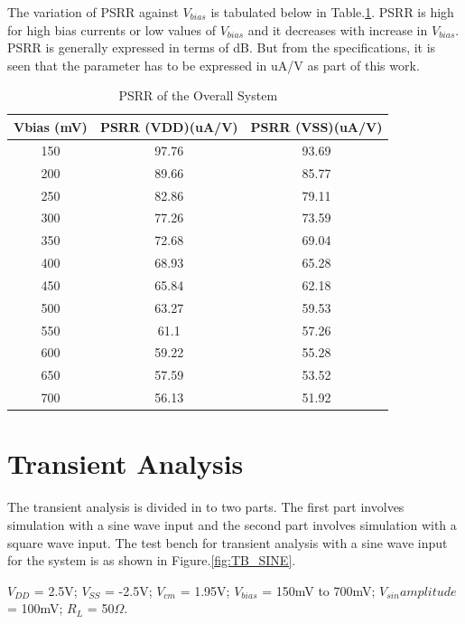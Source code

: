 The variation of PSRR against $V_{bias}$ is tabulated below in Table.\ref{tab:PSRR}. PSRR is high for high bias currents or low values of $V_{bias}$ and it decreases with increase in $V_{bias}$. PSRR is generally expressed in terms of dB. But from the specifications, it is seen that the parameter has to be expressed in uA/V as part of this work.

\begin{table} [H]
\centering
\begin{tabular}{@{}ccc@{}}
\toprule
Vbias (mV)			& PSRR (VDD)(uA/V)			& PSRR (VSS)(uA/V)	 \\ \midrule
150					& 97.76	 					& 93.69					 \\
200					& 89.66 					& 85.77					 \\
250					& 82.86 					& 79.11					 \\
300					& 77.26 					& 73.59					 \\
350					& 72.68						& 69.04					 \\
400					& 68.93						& 65.28					 \\
450					& 65.84 					& 62.18					 \\
500					& 63.27						& 59.53					 \\
550					& 61.1	 					& 57.26					 \\
600					& 59.22 					& 55.28					 \\
650					& 57.59 					& 53.52					 \\
700 				& 56.13 					& 51.92					 \\
\bottomrule
\end{tabular}
\caption{PSRR of the Overall System}
\label{tab:PSRR}
\end{table}

\section{Transient Analysis}
The transient analysis is divided in to two parts. The first part involves simulation with a sine wave input and the second part involves simulation with a square wave input. The test bench for transient analysis with a sine wave input for the system is as shown in Figure.\ref{fig:TB_SINE}.

$V_{DD}$ = 2.5V; $V_{SS}$ = -2.5V; $V_{cm}$ = 1.95V; $V_{bias}$ = 150mV to 700mV;  $V_{sin} amplitude$ = 100mV; $R_{L}$ = 50$\Omega$.

